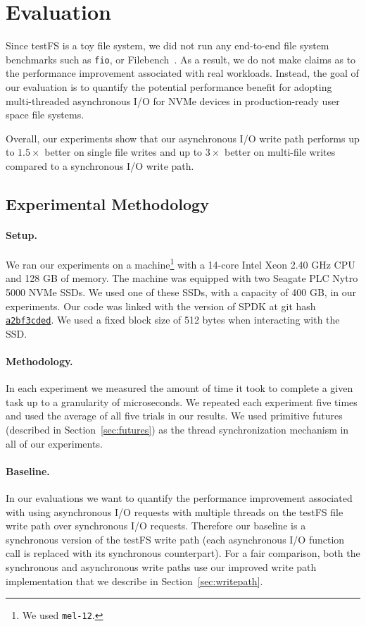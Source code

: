 \section{Evaluation}
Since testFS is a toy file system, we did not run any end-to-end file system
benchmarks such as {\tt fio}, or Filebench~\cite{filebench-tarasov16}. As a
result, we do not make claims as to the performance improvement associated with
real workloads. Instead, the goal of our evaluation is to quantify the
potential performance benefit for adopting multi-threaded asynchronous I/O for
NVMe devices in production-ready user space file systems.

Overall, our experiments show that our asynchronous I/O write path performs up
to $1.5\times$ better on single file writes and up to $3\times$ better on
multi-file writes compared to a synchronous I/O write path.

\subsection{Experimental Methodology}
\paragraph{Setup.}
We ran our experiments on a machine\footnote{We used {\tt mel-12}.} with a
14-core Intel Xeon 2.40 GHz CPU and 128 GB of memory. The machine was equipped
with two Seagate PLC Nytro 5000 NVMe SSDs. We used one of these SSDs, with a
capacity of 400 GB, in our experiments. Our code was linked with the version of
SPDK at git hash
\href{https://github.com/spdk/spdk/commit/a2bf3cded37b7cc7e402eae80da90891f921b56d}{\tt a2bf3cded}.
We used a fixed block size of 512 bytes when interacting with the SSD.

\paragraph{Methodology.}
In each experiment we measured the amount of time it took to complete a given
task up to a granularity of microseconds. We repeated each experiment five
times and used the average of all five trials in our results. We used primitive
futures (described in Section~\ref{sec:futures}) as the thread synchronization
mechanism in all of our experiments.

\paragraph{Baseline.}
In our evaluations we want to quantify the performance improvement associated
with using asynchronous I/O requests with multiple threads on the testFS file
write path over synchronous I/O requests. Therefore our baseline is a
synchronous version of the testFS write path (each asynchronous I/O function
call is replaced with its synchronous counterpart). For a fair comparison, both
the synchronous and asynchronous write paths use our improved write path
implementation that we describe in Section~\ref{sec:writepath}.

